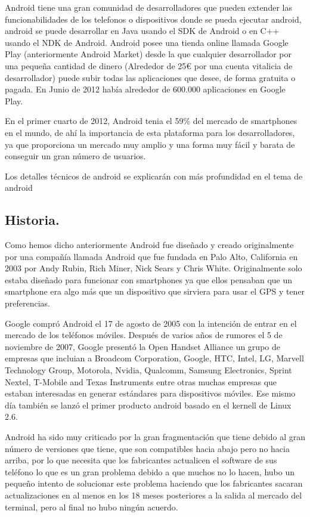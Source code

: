 Android tiene una gran comunidad de desarrolladores que pueden extender las funcionabilidades de los telefonos o dispositivos donde se pueda ejecutar android, android se puede desarrollar en Java usando el SDK de Android o en C++ usando el NDK de Android. Android posee una tienda online llamada Google Play (anteriormente Android Market) desde la que cualquier desarrollador por una pequeña cantidad de dinero (Alrededor de 25€ por una cuenta vitalicia de desarrollador) puede subir todas las aplicaciones que desee, de forma gratuita o pagada. En Junio de 2012 había alrededor de 600.000 aplicaciones en Google Play.

En el primer cuarto de 2012, Android tenia el 59\% del mercado de smartphones en el mundo, de ahí la importancia de esta plataforma para los desarrolladores, ya que proporciona un mercado muy amplio y una forma muy fácil y barata de conseguir un gran número de usuarios.

Los detalles técnicos de android se explicarán con más profundidad en el tema de android

\subsection{Historia.}

Como hemos dicho anteriormente Android fue diseñado y creado originalmente por una compañía llamada Android que fue fundada en Palo Alto, California en 2003 por Andy Rubin, Rich Miner, Nick Sears y Chris White. Originalmente solo estaba diseñado para funcionar con smartphones ya que ellos pensaban que un smartphone era algo más que un dispositivo que sirviera para usar el GPS y tener preferencias. 

Google compró Android el 17 de agosto de 2005 con la intención de entrar en el mercado de los teléfonos móviles. Después de varios años de rumores el 5 de noviembre de 2007, Google presentó la Open Handset Alliance un grupo de empresas que incluian a Broadcom Corporation, Google, HTC, Intel, LG, Marvell Technology Group, Motorola, Nvidia, Qualcomm, Samsung Electronics, Sprint Nextel, T-Mobile and Texas Instruments entre otras muchas empresas que estaban interesadas en generar estándares para dispositivos móviles. Ese mismo día también se lanzó el primer producto android basado en el kernell de Linux 2.6.

Android ha sido muy criticado por la gran fragmentación que tiene debido al gran número de versiones que tiene, que son compatibles hacia abajo pero no hacia arriba, por lo que necesita que los fabricantes actualicen el software de sus teléfono lo que es un gran problema debido a que muchos no lo hacen, hubo un pequeño intento de solucionar este problema haciendo que los fabricantes sacaran actualizaciones en al menos en los 18 meses posteriores a la salida al mercado del terminal, pero al final no hubo ningún acuerdo.   

